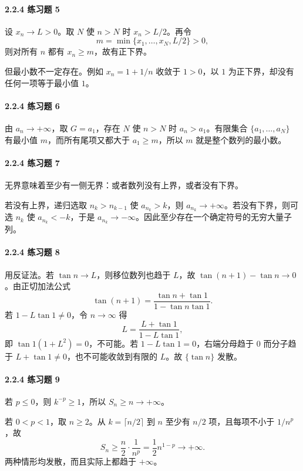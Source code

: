 \paragraph{2.2.4 练习题 5}
\begin{xsolution}
设 $x_n\to L>0$。取 $N$ 使 $n>N$ 时 $x_n>L/2$。再令
\[
  m=\min\{x_1,\ldots,x_N,L/2\}>0,
\]
则对所有 $n$ 都有 $x_n\ge m$，故有正下界。

但最小数不一定存在。例如 $x_n=1+1/n$ 收敛于 $1>0$，以 $1$ 为正下界，却没有任何一项等于最小值 $1$。
\end{xsolution}

\paragraph{2.2.4 练习题 6}
\begin{xsolution}
由 $a_n\to+\infty$，取 $G=a_1$，存在 $N$ 使 $n>N$ 时 $a_n>a_1$。有限集合 $\{a_1,\ldots,a_N\}$ 有最小值 $m$，而所有尾项又都大于 $a_1\ge m$，所以 $m$ 就是整个数列的最小数。
\end{xsolution}

\paragraph{2.2.4 练习题 7}
\begin{xsolution}
无界意味着至少有一侧无界：或者数列没有上界，或者没有下界。

若没有上界，递归选取 $n_k>n_{k-1}$ 使 $a_{n_k}>k$，则 $a_{n_k}\to+\infty$。若没有下界，则可选 $n_k$ 使 $a_{n_k}<-k$，于是 $a_{n_k}\to-\infty$。因此至少存在一个确定符号的无穷大量子列。
\end{xsolution}

\paragraph{2.2.4 练习题 8}
\begin{xsolution}
用反证法。若 $\tan n\to L$，则移位数列也趋于 $L$，故 $\tan(n+1)-\tan n\to0$。由正切加法公式
\[
  \tan(n+1)=\frac{\tan n+\tan1}{1-\tan n\tan1}.
\]
若 $1-L\tan1\ne0$，令 $n\to\infty$ 得
\[
  L=\frac{L+\tan1}{1-L\tan1},
\]
即 $\tan1(1+L^2)=0$，不可能。若 $1-L\tan1=0$，右端分母趋于 $0$ 而分子趋于 $L+\tan1\ne0$，也不可能收敛到有限的 $L$。故 $\{\tan n\}$ 发散。
\end{xsolution}

\paragraph{2.2.4 练习题 9}
\begin{xsolution}
若 $p\le0$，则 $k^{-p}\ge1$，所以 $S_n\ge n\to+\infty$。

若 $0<p<1$，取 $n\ge2$。从 $k=\lceil n/2\rceil$ 到 $n$ 至少有 $n/2$ 项，且每项不小于 $1/n^p$，故
\[
  S_n\ge\frac n2\cdot\frac1{n^p}
  =\frac12n^{1-p}\to+\infty.
\]
两种情形均发散，而且实际上都趋于 $+\infty$。
\end{xsolution}

